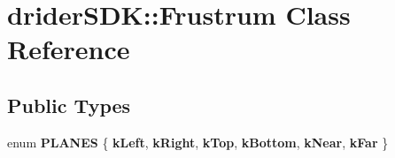 \hypertarget{classdrider_s_d_k_1_1_frustrum}{}\section{drider\+S\+DK\+:\+:Frustrum Class Reference}
\label{classdrider_s_d_k_1_1_frustrum}
\subsection*{Public Types}
\begin{DoxyCompactItemize}
\item 
\mbox{\label{classdrider_s_d_k_1_1_frustrum_afb452e1845d8d057840dec11ad282f0a}} 
enum {\bfseries P\+L\+A\+N\+ES} \{ \newline
{\bfseries k\+Left}, 
{\bfseries k\+Right}, 
{\bfseries k\+Top}, 
{\bfseries k\+Bottom}, 
\newline
{\bfseries k\+Near}, 
{\bfseries k\+Far}
 \}
\end{DoxyCompactItemize}
